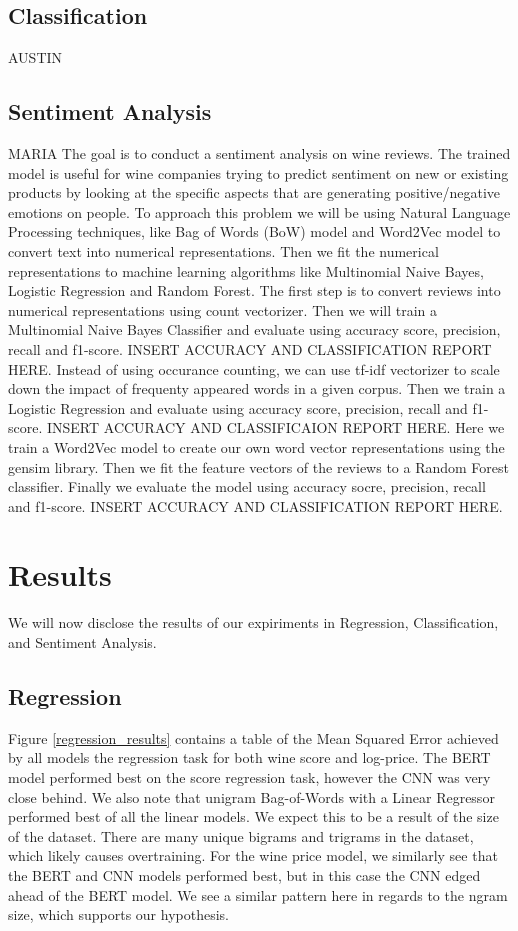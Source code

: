 \documentclass[10pt]{IEEEtran}
\begin{document}
\subsection{Classification}
AUSTIN

\subsection{Sentiment Analysis}
    MARIA
    The goal is to conduct a sentiment analysis on wine reviews. The trained model is useful for wine companies trying to predict sentiment on new or existing products by looking at the specific aspects that are generating positive/negative emotions on people.   
    To approach this problem we will be using Natural Language Processing techniques, like Bag of Words (BoW) model and Word2Vec model to convert text into numerical representations. Then we fit the numerical representations to machine learning algorithms like Multinomial Naive Bayes, Logistic Regression and Random Forest. 
    The first step is to convert reviews into numerical representations using count vectorizer. Then we will train a Multinomial Naive Bayes Classifier and evaluate using accuracy score, precision, recall and f1-score. 
    INSERT ACCURACY AND CLASSIFICATION REPORT HERE.
    Instead of using occurance counting, we can use tf-idf vectorizer to scale down the impact of frequenty appeared words in a given corpus. Then we train a Logistic Regression and evaluate using accuracy score, precision, recall and f1-score. 
    INSERT ACCURACY AND CLASSIFICAION REPORT HERE. 
    Here we train a Word2Vec model to create our own word vector representations using the gensim library. Then we fit the feature vectors of the reviews to a Random Forest classifier. Finally we evaluate the model using accuracy socre, precision, recall and f1-score. 
    INSERT ACCURACY AND CLASSIFICATION REPORT HERE. 

\section{Results}
    We will now disclose the results of our expiriments in Regression, Classification, and Sentiment Analysis.

\subsection{Regression}
    Figure \ref{regression_results} contains a table of the Mean Squared Error achieved by all models the regression task for both wine score and log-price. The BERT model performed best on the score regression task, however the CNN was very close behind. We also note that unigram Bag-of-Words with a Linear Regressor performed best of all the linear models. We expect this to be a result of the size of the dataset. There are many unique bigrams and trigrams in the dataset, which likely causes overtraining. For the wine price model, we similarly see that the BERT and CNN models performed best, but in this case the CNN edged ahead of the BERT model. We see a similar pattern here in regards to the ngram size, which supports our hypothesis.
\end{document}
